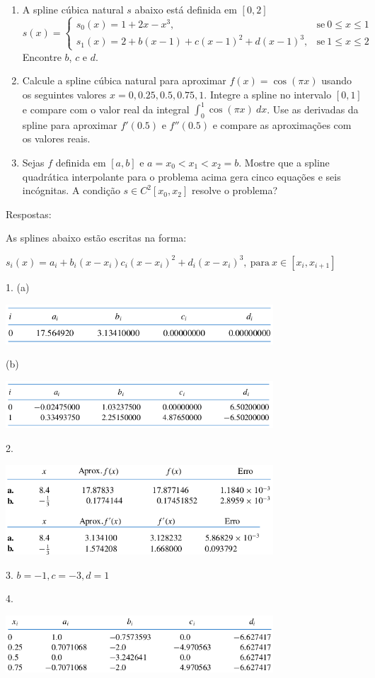 \documentclass{article}
\begin{document}
\begin{enumerate}
	\item A spline c\'ubica natural $s$ abaixo est\'a definida em $[0,2]$
		\[s(x) = \left\{\begin{array}{ll}
					s_0(x) = 1+2x-x^3, & \text{se}\ 0 \le x \le 1 \\
					s_1(x) = 2+b(x-1)+c(x-1)^2+d(x-1)^3, & \text{se}\ 1 \le x \le 2
				\end{array}\right.\]
		Encontre $b$, $c$ e $d$.

	\item Calcule a spline c\'ubica natural para aproximar $f(x) = \cos(\pi x)$
		usando os seguintes valores $x=0, 0.25, 0.5, 0.75, 1$. Integre a spline
		no intervalo $[0,1]$ e compare com o valor real da integral
		$\int_0^1\cos(\pi x)\ dx$. Use as derivadas da spline para aproximar
		$f'(0.5)$ e $f''(0.5)$ e compare as aproxima\c{c}\~oes com os valores reais.

	\item Sejas $f$ definida em $[a,b]$ e $a=x_0<x_1<x_2=b$. Mostre que a
		spline quadr\'atica interpolante para o problema acima gera cinco
		equa\c{c}\~oes e seis inc\'ognitas. A condi\c{c}\~ao $s\in C^2[x_0, x_2]$ resolve o
		problema?
\end{enumerate}

Respostas:

As splines abaixo est\~ao escritas na forma:

$s_i(x) = a_i + b_i(x-x_i) c_i{(x-x_i)}^2 + d_i{(x-x_i)}^3,\ \text{para}\
x\in[x_i, x_{i+1}]$

\noindent{}1. (a)

\includegraphics[width=0.75\textwidth]{1a.png}
\newpage{}

(b)

\includegraphics[width=0.75\textwidth]{1b.png}

\noindent{}2.

\includegraphics[width=0.75\textwidth]{2.png}

\noindent{}3. $b=-1, c=-3, d=1$

\noindent{}4.

\includegraphics[width=0.75\textwidth]{6.png}
\end{document}
